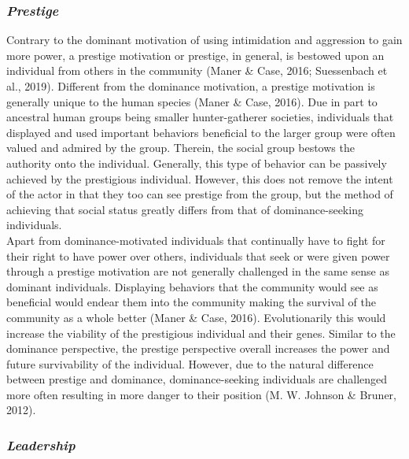 \documentclass[
  donotrepeattitle,doc, 12pt, a4paper,floatsintext]{apa7}
\begin{document}
\hypertarget{prestige}{%
\subsubsection{\texorpdfstring{\emph{Prestige}}{Prestige}}\label{prestige}}

Contrary to the dominant motivation of using intimidation and aggression to gain more power, a prestige motivation or prestige, in general, is bestowed upon an individual from others in the community (Maner \& Case, 2016; Suessenbach et al., 2019). Different from the dominance motivation, a prestige motivation is generally unique to the human species (Maner \& Case, 2016). Due in part to ancestral human groups being smaller hunter-gatherer societies, individuals that displayed and used important behaviors beneficial to the larger group were often valued and admired by the group. Therein, the social group bestows the authority onto the individual. Generally, this type of behavior can be passively achieved by the prestigious individual. However, this does not remove the intent of the actor in that they too can see prestige from the group, but the method of achieving that social status greatly differs from that of dominance-seeking individuals.\\

Apart from dominance-motivated individuals that continually have to fight for their right to have power over others, individuals that seek or were given power through a prestige motivation are not generally challenged in the same sense as dominant individuals. Displaying behaviors that the community would see as beneficial would endear them into the community making the survival of the community as a whole better (Maner \& Case, 2016). Evolutionarily this would increase the viability of the prestigious individual and their genes. Similar to the dominance perspective, the prestige perspective overall increases the power and future survivability of the individual. However, due to the natural difference between prestige and dominance, dominance-seeking individuals are challenged more often resulting in more danger to their position (M. W. Johnson \& Bruner, 2012).

\hypertarget{leadership}{%
\subsubsection{\texorpdfstring{\emph{Leadership}}{Leadership}}\label{leadership}}
\end{document}
